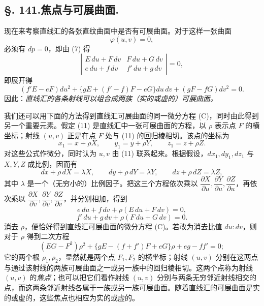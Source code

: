 \subsection*{\S. 141.\quad 焦点与可展曲面.}

现在来考察直线汇的各张直纹曲面中是否有可展曲面。对于这样一张曲面
\begin{equation}\tag{11}
 \varphi(u,v)=0,
\end{equation}
必须有 \(dp=0\)，即由 (7) 得
\[
\left|
\begin{matrix}
E\,du+F\,dv & F\,du+G\,dv\\
e\,du+f\,dv & f'\,du+g\,dv
\end{matrix}
\right|=0,
\]
即展开得
\begin{equation}\tag{C}
 (f'E-eF)du^2+\{gE+(f'-f)F-eG\}du\,dv+(gF-fG)dv^2=0.
\end{equation}
因此：\emph{直线汇的各条射线可以组合成两族（实的或虚的）可展曲面。}

我们还可以用下面的方法得到直线汇可展曲面的同一微分方程 (C)，同时由此得到另一个重要元素。假定 (11) 是直线汇中一张可展曲面的方程，以 \(\rho\) 表示点 \(F\) 的横坐标；射线 \((u,v)\) 正是在点 \(F\) 处与 (11) 的回归棱相切。该点的坐标为
\[
 x_1=x+\rho X,
 \qquad y_1=y+\rho Y,
 \qquad z_1=z+\rho Z.
\]
对这些公式作微分，同时认为 \(u,v\) 由 (11) 联系起来。根据假设，\(dx_1,dy_1,dz_1\) 与 \(X,Y,Z\) 成比例，因而有
\[
 dx+\rho\,dX=\lambda X,
 \qquad dy+\rho\,dY=\lambda Y,
 \qquad dz+\rho\,dZ=\lambda Z,
\]
其中 \(\lambda\) 是一个（无穷小的）比例因子。把这三个方程依次乘以 \(\dfrac{\partial X}{\partial u},\dfrac{\partial Y}{\partial u},\dfrac{\partial Z}{\partial u}\)，再依次乘以 \(\dfrac{\partial X}{\partial v},\dfrac{\partial Y}{\partial v},\dfrac{\partial Z}{\partial v}\)，并分别相加，得到
\[
 e\,du+f\,dv+\rho(E\,du+F\,dv)=0,
\]
\[
 f'\,du+g\,dv+\rho(F\,du+G\,dv)=0.
\]
消去 \(\rho\)，便恰好得到直线汇可展曲面的微分方程 (C)。若改为消去比值 \(du:dv\)，则对于 \(\rho\) 得到二次方程
\begin{equation}\tag{D}
 (EG-F^2)\rho^2+\{gE-(f+f')F+eG\}\rho+eg-ff'=0;
\end{equation}
它的两个根 \(\rho_1,\rho_2\)，显然就是两个点 \(F_1,F_2\) 的横坐标；射线 \((u,v)\) 分别在这两点与通过该射线的两族可展曲面之一或另一族中的回归棱相切。这两个点称为射线 \((u,v)\) 的\emph{焦点}；也可以把它们看作射线 \((u,v)\) 分别与两条无穷邻近射线相交的点，而这两条邻近射线各属于一族或另一族可展曲面。随着直线汇的可展曲面是实的或虚的，这些焦点也相应为实的或虚的。


